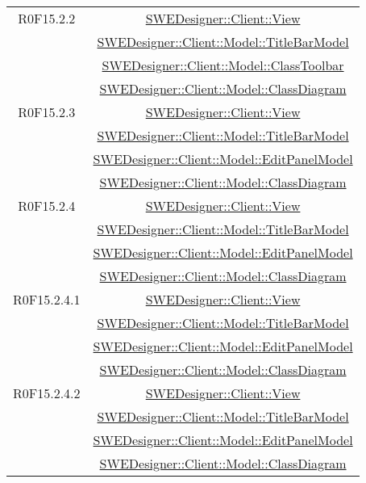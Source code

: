 \documentclass[../SpecificaTecnica.tex]{subfiles}
\begin{document}
\begin{longtable}{|c|c|}
		R0F15.2.2 & \hyperlink{SWEDesigner::Client::View}{SWEDesigner::Client::View}\\& \hyperlink{SWEDesigner::Client::Model::TitleBarModel}{SWEDesigner::Client::Model::TitleBarModel}\\& \hyperlink{SWEDesigner::Client::Model::ClassToolbar}{SWEDesigner::Client::Model::ClassToolbar}\\& \hyperlink{SWEDesigner::Client::Model::ClassDiagram}{SWEDesigner::Client::Model::ClassDiagram}\\\hline
		R0F15.2.3 & \hyperlink{SWEDesigner::Client::View}{SWEDesigner::Client::View}\\& \hyperlink{SWEDesigner::Client::Model::TitleBarModel}{SWEDesigner::Client::Model::TitleBarModel}\\& \hyperlink{SWEDesigner::Client::Model::EditPanelModel}{SWEDesigner::Client::Model::EditPanelModel}\\& \hyperlink{SWEDesigner::Client::Model::ClassDiagram}{SWEDesigner::Client::Model::ClassDiagram}\\\hline
		R0F15.2.4 & \hyperlink{SWEDesigner::Client::View}{SWEDesigner::Client::View}\\& \hyperlink{SWEDesigner::Client::Model::TitleBarModel}{SWEDesigner::Client::Model::TitleBarModel}\\& \hyperlink{SWEDesigner::Client::Model::EditPanelModel}{SWEDesigner::Client::Model::EditPanelModel}\\& \hyperlink{SWEDesigner::Client::Model::ClassDiagram}{SWEDesigner::Client::Model::ClassDiagram}\\\hline
		R0F15.2.4.1 & \hyperlink{SWEDesigner::Client::View}{SWEDesigner::Client::View}\\& \hyperlink{SWEDesigner::Client::Model::TitleBarModel}{SWEDesigner::Client::Model::TitleBarModel}\\& \hyperlink{SWEDesigner::Client::Model::EditPanelModel}{SWEDesigner::Client::Model::EditPanelModel}\\& \hyperlink{SWEDesigner::Client::Model::ClassDiagram}{SWEDesigner::Client::Model::ClassDiagram}\\\hline
		R0F15.2.4.2 & \hyperlink{SWEDesigner::Client::View}{SWEDesigner::Client::View}\\& \hyperlink{SWEDesigner::Client::Model::TitleBarModel}{SWEDesigner::Client::Model::TitleBarModel}\\& \hyperlink{SWEDesigner::Client::Model::EditPanelModel}{SWEDesigner::Client::Model::EditPanelModel}\\& \hyperlink{SWEDesigner::Client::Model::ClassDiagram}{SWEDesigner::Client::Model::ClassDiagram}\\\hline

\end{longtable}
\end{document}
